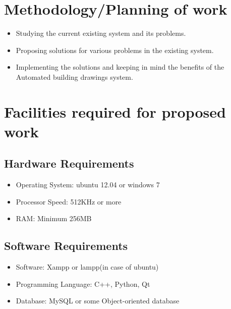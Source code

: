 \section{Methodology/Planning of work}
\begin{itemize}
\item Studying the current existing system and its problems.
\item Proposing solutions for various problems in the existing system.
\item Implementing the solutions and keeping in mind the benefits of the Automated building drawings system.
\end{itemize}

\section{Facilities required for proposed work}
\subsection{Hardware Requirements}
\begin{itemize}
\item Operating System: ubuntu 12.04 or windows 7
\item Processor Speed: 512KHz or more
\item RAM: Minimum 256MB
\end{itemize}
\subsection{Software Requirements}
\begin{itemize}
\item Software: Xampp or lampp(in case of ubuntu)
\item Programming Language: C++, Python, Qt
\item Database: MySQL or some Object-oriented database
\end{itemize}










